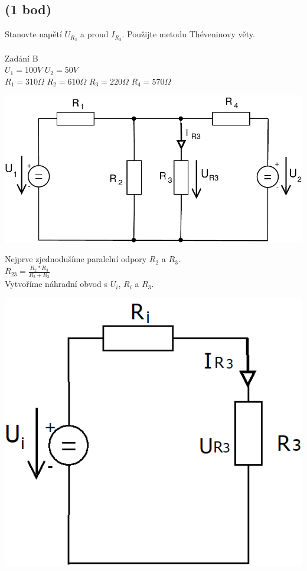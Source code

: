 \documentclass{article}
\begin{document}
\begin{large}
\newpage

\section{(1 bod)}


    Stanovte napětí $U_{R_3}$ a proud $I_{R_3}$. Použijte metodu Théveninovy věty.\\~\\
    Zadání B\\
    $U_1=100V$
    $U_2=50V$\\
    $R_1=310\Omega$
    $R_2=610\Omega$
    $R_3=220\Omega$
    $R_4=570\Omega$
    


\begin{center}
    \includegraphics[scale=0.6]{Pr2/Pr2_2017.pdf}
\end{center}


    Nejprve zjednodušíme paralelní odpory $R_2$ a $R_3$.\\
    
    $R_{23}=\frac{R_2*R_3}{R_2+R_3}$\\
    
    Vytvoříme náhradní obvod s $U_i$, $R_i$ a $R_3$.\\


\begin{center}
    \includegraphics[scale=0.3]{Pr2/Pr2_2017_2.png}
\end{center}


\end{large}
\end{document}
